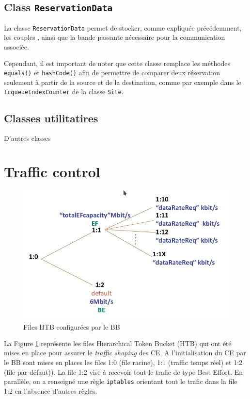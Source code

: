 \documentclass[a4paper,11pt]{article}
\let\Oldsection\section
\renewcommand{\section}{\FloatBarrier\Oldsection}
\let\Oldsubsection\subsection
\renewcommand{\subsection}{\FloatBarrier\Oldsubsection}
\begin{document}
\subsection{Class \texttt{ReservationData}}

La classe \texttt{ReservationData} permet de stocker, comme expliquée précédemment, les couples , ainsi que la bande passante nécessaire pour la communication associée.

Cependant, il est important de noter que cette classe remplace les méthodes \texttt{equals()} et \texttt{hashCode()} afin de permettre de comparer deux réservation seulement à partir de la source et de la destination, comme par exemple dans le \texttt{tcqueueIndexCounter} de la classe \texttt{Site}.

\subsection{Classes utilitatires}

D'autres classes 

\section{Traffic control}

\begin{figure}[htp]
    \centering
    \includegraphics[width=\textwidth]{images/tc.png}
    \caption{Files HTB configurées par le BB}
    \label{fig:htb-files}
\end{figure}

La Figure \ref{fig:htb-files} représente les files Hierarchical Token Bucket (HTB) qui ont été mises en place pour assurer le \emph{traffic shaping} des CE. 
A l’initialisation du CE par le BB sont mises en places les files 1:0 (file racine), 1:1 (traffic temps réel) et 1:2 (file par défaut)). La file 1:2 vise à recevoir tout le trafic de type Best Effort. En parallèle, on a renseigné une règle \texttt{iptables} orientant tout le trafic dans la file 1:2 en l'absence d'autres règles.
\end{document}
